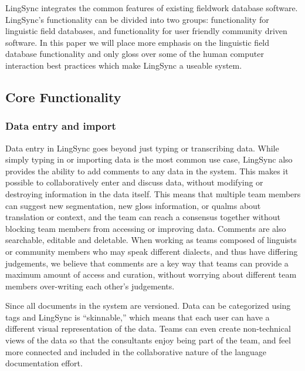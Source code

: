 \documentclass[letterpaper, 12pt, dvips]{mitwpl}
\begin{document}
LingSync integrates the common features of existing fieldwork database software. 
LingSync's functionality can be divided into two groups: functionality for linguistic field databases,
and functionality for user friendly community driven software.
In this paper we will place more emphasis on the linguistic field database functionality and only gloss over some of the human computer interaction best practices which make LingSync a useable system. 

\subsection{Core Functionality}
\label{sec:core}
\subsubsection{Data entry and import}


Data entry in LingSync goes beyond just typing or transcribing data.
While simply typing in or importing data is the most common use case,
LingSync also provides the ability to add comments to any data in the system.
This makes it possible to collaboratively enter and discuss data,
without modifying or destroying information in the data itself.
This means that multiple team members can suggest new segmentation,
new gloss information,
or qualms about translation or context,
and the team can reach a consensus together without blocking team members from accessing or improving data.
Comments are also searchable, editable and deletable.
When working as teams composed of linguists or community members who may speak different dialects,
and thus have differing judgements,
we believe that comments are a key way that teams can provide a maximum amount of access and curation,
without worrying about different team members over-writing each other's judgements.


Since all documents in the system are versioned. Data can be categorized using tags and LingSync is ``skinnable,''
which means that each user can have a different visual representation of the data.
Teams can even create non-technical views of the data so that the consultants enjoy being part of the team, and feel more connected and included in  the collaborative nature of the language documentation effort.
\end{document}
